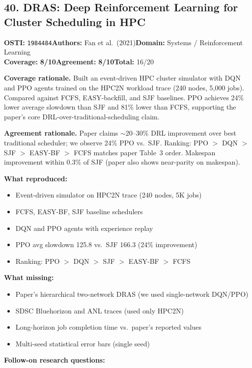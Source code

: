 \documentclass[11pt]{article}
\newcommand{\scorebadge}[2]{\textbf{#1:} \textbf{#2/10}}
\begin{document}
\subsection{40. DRAS: Deep Reinforcement Learning for Cluster Scheduling in HPC}
\textbf{OSTI:} \texttt{1984484}\quad\textbf{Authors:} Fan et al.\ (2021)\quad\textbf{Domain:} Systems / Reinforcement Learning\\
\scorebadge{Coverage}{8}\quad\scorebadge{Agreement}{8}\quad\textbf{Total:} 16/20\par\smallskip
\noindent\textbf{Coverage rationale.} Built an event-driven HPC cluster simulator with DQN and PPO agents trained on the HPC2N workload trace (240 nodes, 5,000 jobs). Compared against FCFS, EASY-backfill, and SJF baselines. PPO achieves 24\% lower average slowdown than SJF and 81\% lower than FCFS, supporting the paper's core DRL-over-traditional-scheduling claim.\par
\noindent\textbf{Agreement rationale.} Paper claims $\sim$20--30\% DRL improvement over best traditional scheduler; we observe 24\% PPO vs.\ SJF. Ranking: PPO $>$ DQN $>$ SJF $>$ EASY-BF $>$ FCFS matches paper Table~3 order. Makespan improvement within 0.3\% of SJF (paper also shows near-parity on makespan).\par\smallskip
\noindent\textbf{What reproduced:}
\begin{itemize}[leftmargin=1.4em,itemsep=0.2em,topsep=0.2em]
\item Event-driven simulator on HPC2N trace (240 nodes, 5K jobs)
\item FCFS, EASY-BF, SJF baseline schedulers
\item DQN and PPO agents with experience replay
\item PPO avg slowdown 125.8 vs.\ SJF 166.3 (24\% improvement)
\item Ranking: PPO $>$ DQN $>$ SJF $>$ EASY-BF $>$ FCFS
\end{itemize}
\noindent\textbf{What missing:}
\begin{itemize}[leftmargin=1.4em,itemsep=0.2em,topsep=0.2em]
\item Paper's hierarchical two-network DRAS (we used single-network DQN/PPO)
\item SDSC Bluehorizon and ANL traces (used only HPC2N)
\item Long-horizon job completion time vs.\ paper's reported values
\item Multi-seed statistical error bars (single seed)
\end{itemize}
\noindent\textbf{Follow-on research questions:}
\end{document}
